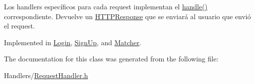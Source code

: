 Los handlers específicos para cada request implementan el \hyperlink{class_request_handler_ada5c3c1669e6c2e4b46923a42b1fdab6}{handle()} correspondiente. Devuelve un \hyperlink{class_h_t_t_p_response}{H\+T\+T\+P\+Response} que se enviará al usuario que envió el request. 



Implemented in \hyperlink{class_login_a911fa05b2b1b8f53cad4286012a7810d}{Login}, \hyperlink{class_sign_up_a3d34e2bcdce1556d4a44bb589ed64ddf}{Sign\+Up}, and \hyperlink{class_matcher_aa88fa5bbb00fe8a0a4b6405f8c22ffa3}{Matcher}.



The documentation for this class was generated from the following file\+:\begin{DoxyCompactItemize}
\item 
Handlers/\hyperlink{_request_handler_8h}{Request\+Handler.\+h}\end{DoxyCompactItemize}
